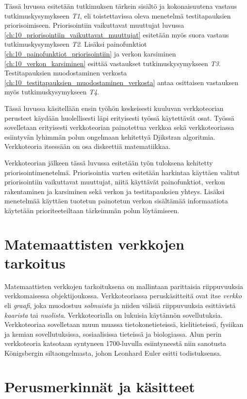 Tässä luvussa esitetään tutkimuksen tärkein sisältö ja kokonaisuutena vastaus tutkimuskysymykseen \emph{T1}, eli toistettavissa oleva menetelmä testitapauksien priorisoimiseen.
Priorisointiin vaikuttavat muuttujat luvussa \ref{ch:10_priorisointiin_vaikuttavat_muuttujat} esitetään myös suora vastaus tutkimuskysymykseen \emph{T2}.
Lisäksi painofunktiot \ref{ch:10_painofunktiot_priorisointiin} ja verkon karsiminen \ref{ch:10_verkon_karsiminen} esittää vastaukset tutkimuskysymykseen \emph{T3}.
Testitapauksien muodostaminen verkosta \ref{ch:10_testitapauksien_muodostaminen_verkosta} antaa osittaisen vastauksen myös tutkimuskysymykseen \emph{T4}.

Tässä luvussa käsitellään ensin työhön keskeisesti kuuluvan verkkoteorian perusteet käydään huolellisesti läpi erityisesti työssä käytettävät osat.
Työssä sovelletaan erityisesti verkkoteorian painotettua verkkoa sekä verkkoteoriassa esiintyvän lyhimmän polun ongelmaan kehitettyä Djikstran algoritmia.
Verkkoteoria itsessään on osa diskeettiä matematiikkaa.

Verkkoteorian jälkeen tässä luvussa esitetään työn tuloksena kehitetty priorisointimenetelmä.
Priorisointia varten esitetään harkintaa käyttäen valitut priorisointiin vaikuttavat muuttujat, niitä käyttävät painofunktiot, verkon rakentaminen ja karsiminen sekä verkon ja testitapauksien yhteys.
Lisäksi menetelmää käyttäen tuotetun painotetun verkon sisältämää informaatiota käytetään prioriteeteiltaan tärkeimmän polun löytämiseen.

\section{Matemaattisten verkkojen tarkoitus} \label{ch:09_matemaattisten_verkkojen_tarkoitus}

  Matemaattisten verkkojen tarkoituksena on mallintaan parittaisia riippuvuuksia verkkomaisessa objektijoukossa.
  Verkkoteoriassa peruskäsitteitä ovat itse \emph{verkko} eli \emph{graafi}, joka muodostuu \emph{solmuista} ja niiden välisiä riippuvuuksia esittävistä \emph{kaarista} tai \emph{nuolista}.
  Verkkoteorialla on lukuisia käytännön sovellutuksia. Verkkoteoriaa sovelletaan muun muassa tietokonetieteissä, kielitieteissä, fysiikan ja kemian sovellutuksissa, sosiaalisissa tieteissä ja biologiassa.
  Alun perin verkkoteoria katsotaan syntyneen 1700-luvulla esiintyneestä niin sanotusta Königsbergin siltaongelmasta, johon Leonhard Euler esitti todistuksensa.

\section{Perusmerkinnät ja käsitteet} \label{ch:09_perusmerkinnat_ja_kasitteet}

